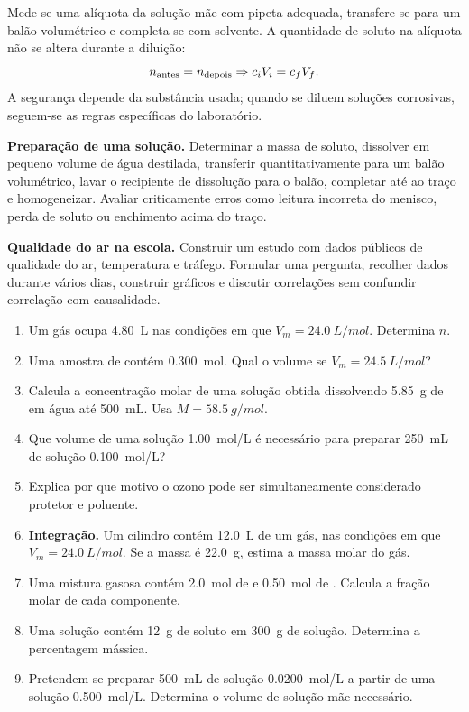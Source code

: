 \documentclass[11pt,a4paper,oneside]{book}
\begin{document}
\begin{atividade}[title=AL 2.3 -- Diluição de uma solução]
Mede-se uma alíquota da solução-mãe com pipeta adequada, transfere-se para um balão volumétrico e completa-se com solvente. A quantidade de soluto na alíquota não se altera durante a diluição:
\[
n_{\rm antes}=n_{\rm depois}\Rightarrow c_iV_i=c_fV_f.
\]
A segurança depende da substância usada; quando se diluem soluções corrosivas, seguem-se as regras específicas do laboratório.
\end{atividade}

\begin{atividade}[title=Extensão -- preparação de uma solução]
\textbf{Preparação de uma solução.} Determinar a massa de soluto, dissolver em pequeno volume de água destilada, transferir quantitativamente para um balão volumétrico, lavar o recipiente de dissolução para o balão, completar até ao traço e homogeneizar. Avaliar criticamente erros como leitura incorreta do menisco, perda de soluto ou enchimento acima do traço.
\end{atividade}

\begin{stem}
\textbf{Qualidade do ar na escola.} Construir um estudo com dados públicos de qualidade do ar, temperatura e tráfego. Formular uma pergunta, recolher dados durante vários dias, construir gráficos e discutir correlações sem confundir correlação com causalidade.
\end{stem}

\begin{exercicios}
\begin{enumerate}
  \item Um gás ocupa \SI{4.80}{L} nas condições em que $V_m=\SI{24.0}{L/mol}$. Determina $n$.
  \item Uma amostra de  contém \SI{0.300}{mol}. Qual o volume se $V_m=\SI{24.5}{L/mol}$?
  \item Calcula a concentração molar de uma solução obtida dissolvendo \SI{5.85}{g} de  em água até \SI{500}{mL}. Usa $M=\SI{58.5}{g/mol}$.
  \item Que volume de uma solução \SI{1.00}{mol/L} é necessário para preparar \SI{250}{mL} de solução \SI{0.100}{mol/L}?
  \item Explica por que motivo o ozono pode ser simultaneamente considerado protetor e poluente.
  \item \textbf{Integração.} Um cilindro contém \SI{12.0}{L} de um gás, nas condições em que $V_m=\SI{24.0}{L/mol}$. Se a massa é \SI{22.0}{g}, estima a massa molar do gás.
  \item Uma mistura gasosa contém \SI{2.0}{mol} de  e \SI{0.50}{mol} de . Calcula a fração molar de cada componente.
  \item Uma solução contém \SI{12}{g} de soluto em \SI{300}{g} de solução. Determina a percentagem mássica.
  \item Pretendem-se preparar \SI{500}{mL} de solução \SI{0.0200}{mol/L} a partir de uma solução \SI{0.500}{mol/L}. Determina o volume de solução-mãe necessário.
\end{enumerate}
\end{exercicios}
\end{document}
